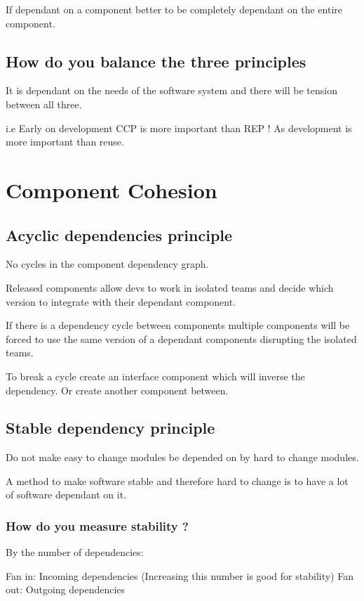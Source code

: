\documentclass[11pt]{scrartcl} %
\begin{document}
If dependant on a component better to be completely dependant on the
entire component.

\subsection{How do you balance the three principles}

It is dependant on the needs of the software system and there will be
tension between all three.

i.e Early on development CCP is more important than REP ! As development
is more important than reuse.


\section{Component Cohesion}

\subsection{Acyclic dependencies principle}

No cycles in the component dependency graph.

Released components allow devs to work in isolated teams and decide
which version to integrate with their dependant component.

If there is a dependency cycle between components multiple components
will be forced to use the same version of a dependant components
disrupting the isolated teams.

To break a cycle create an interface component which will inverse the
dependency. Or create another component between.

\subsection{Stable dependency principle}

Do not make easy to change modules be depended on by hard to change
modules.

A method to make software stable and therefore hard to change is to have
a lot of software dependant on it.

\subsubsection{How do you measure stability ?}

By the number of dependencies:

Fan in: Incoming dependencies (Increasing this number is good for
stability) Fan out: Outgoing dependencies
\end{document}
